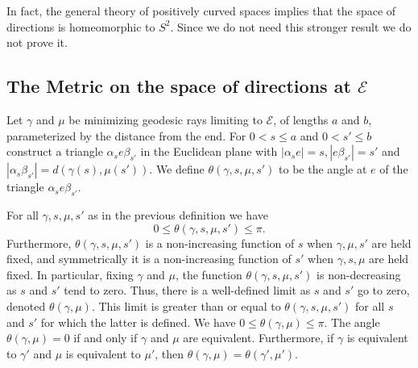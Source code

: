 \begin{remark}
\label{rem:space-of-directions-topology}
In fact, the general theory of positively curved spaces implies that
the space of directions is homeomorphic to $S^2$. Since we do not
need this stronger result we do not prove it.
\end{remark}

\subsection{The Metric on the space of directions at ${\mathcal
E}$}



\begin{definition}
\label{def:angle-between-directions-theta}
\label{defntheta}

Let $\gamma$ and $\mu$ be minimizing geodesic rays limiting to
${\mathcal E}$, of lengths $a$ and $b$, parameterized by the
distance from the end. For $0<s\le a$ and $0<s'\le b$ construct a
triangle $\alpha_se\beta_{s'}$ in the Euclidean plane with
$|\alpha_se|=s, |e\beta_{s'}|=s'$ and
$|\alpha_s\beta_{s'}|=d(\gamma(s),\mu(s'))$. We define
$\theta(\gamma,s,\mu,s')$ to be the angle at $e$ of the triangle
$\alpha_se\beta_{s'}$.
\end{definition}

\begin{lemma}
\label{lem:theta-monotone-convergence}
\label{thetaconv}

For all $\gamma,s,\mu,s'$ as in the previous definition we have
$$0\le \theta(\gamma,s,\mu,s')\le \pi.$$ Furthermore,  $\theta(\gamma,s,\mu,s')$
is a non-increasing function of $s$  when $\gamma,\mu,s'$ are held
fixed, and symmetrically it is a non-increasing function of $s'$
when $\gamma,s,\mu$ are held fixed. In particular, fixing $\gamma$
and $\mu$, the function $\theta(\gamma,s,\mu,s')$ is non-decreasing
as $s$ and $s'$ tend to zero. Thus, there is a well-defined limit as
$s$ and $s'$ go to zero, denoted $ \theta(\gamma,\mu)$. This limit
is greater than or equal to $\theta(\gamma,s,\mu,s')$ for all $s$
and $s'$ for which the latter is defined. We have
$0\le\theta(\gamma,\mu)\le \pi$. The angle $\theta(\gamma,\mu)=0$ if
and only if $\gamma$ and $\mu$ are equivalent. Furthermore, if
$\gamma$ is equivalent to $\gamma'$ and $\mu$ is equivalent to
$\mu'$, then $\theta(\gamma,\mu)=\theta(\gamma',\mu')$.
\end{lemma}


